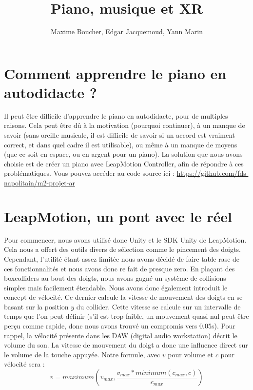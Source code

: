 \documentclass{article}
\title{Piano, musique et XR}
\author{Maxime Boucher, Edgar Jacquemoud, Yann Marin}
\begin{document}
\maketitle

\section{Comment apprendre le piano en autodidacte ?}

Il peut être difficile d'apprendre le piano en autodidacte, pour de multiples raisons. Cela peut être dû à la motivation (pourquoi continuer), à un manque de savoir (sans oreille musicale, il est difficile de savoir si un accord est vraiment correct, et dans quel cadre il est utilisable), ou même à un manque de moyens (que ce soit en espace, ou en argent pour un piano).
\newline
\newline
La solution que nous avons choisie est de créer un piano avec LeapMotion Controller, afin de répondre à ces problématiques. Vous pouvez accéder au code source ici : \href{https://github.com/fds-napolitain/m2-projet-ar}{https://github.com/fds-napolitain/m2-projet-ar}

\section{LeapMotion, un pont avec le réel}

Pour commencer, nous avons utilisé donc Unity et le SDK Unity de LeapMotion. Cela nous a offert des outils divers de sélection comme le pincement des doigts. Cependant, l'utilité étant assez limitée nous avons décidé de faire table rase de ces fonctionnalités et nous avons donc re fait de presque zero.
\newline
\newline
En plaçant des boxcolliders au bout des doigts, nous avons gagné un système de collisions simples mais facilement étendable. Nous avons donc également introduit le concept de vélocité.
\newline
\newline
Ce dernier calcule la vitesse de mouvement des doigts en se basant sur la position $y$ du collider. Cette vitesse se calcule sur un intervalle de temps que l'on peut définir (s'il est trop faible, un mouvement quasi nul peut être perçu comme rapide, donc nous avons trouvé un compromis vers 0.05s). 
\newline
\newline
Pour rappel, la vélocité présente dans les DAW (digital audio workstation) décrit le volume du son. La vitesse de mouvement du doigt a donc une influence direct sur le volume de la touche appuyée. Notre formule, avec $v$ pour volume et $c$ pour vélocité sera :
\begin{equation}
    v = maximum(v_{max}, \frac{v_{max} * minimum(c_{max}, c)}{c_{max}})
\end{equation}
\end{document}
